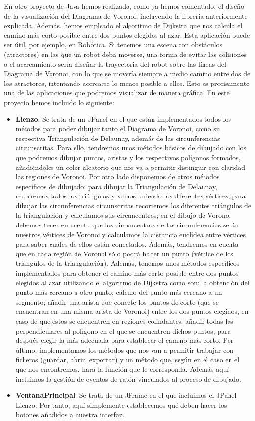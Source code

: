 En otro proyecto de Java hemos realizado, como ya hemos comentado, el diseño de la visualización del Diagrama de Voronoi, incluyendo la librería anteriormente explicada. Además, hemos empleado el algoritmo de Dijkstra que nos calcula el camino más corto posible entre dos puntos elegidos al azar. Esta aplicación puede ser útil, por ejemplo, en Robótica. Si tenemos una escena con obstáculos (atractores) en las que un robot deba moverse, una forma de evitar las colisiones o el acercamiento sería diseñar la trayectoria del robot sobre las líneas del Diagrama de Voronoi, con lo que se movería siempre a medio camino entre dos de los atractores, intentando acercarse lo menos posible a ellos. Esto es precisamente una de las aplicaciones que podremos visualizar de manera gráfica. En este proyecto hemos incluido lo siguiente:

\begin{itemize}
    \item \textbf{Lienzo}: Se trata de un JPanel en el que están implementados todos los métodos para poder dibujar tanto el Diagrama de Voronoi, como su respectiva Triangulación de Delaunay, además de las circunferencias circunscritas. Para ello, tendremos unos métodos básicos de dibujado con los que podremos dibujar puntos, aristas y los respectivos polígonos formados, añadiéndoles un color aleatorio que nos va a permitir distinguir con claridad las regiones de Voronoi. Por otro lado disponemos de otros métodos específicos de dibujado: para dibujar la Triangulación de Delaunay, recorremos todos los triángulos y vamos uniendo los diferentes vértices; para dibujar las circunferencias circunscritas recorremos los diferentes triángulos de la triangulación y calculamos sus circuncentros; en el dibujo de Voronoi debemos tener en cuenta que los circuncentros de las circunferencias serán nuestros vértices de Voronoi y calculamos la distancia euclídea entre vértices para saber cuáles de ellos están conectados. Además, tendremos en cuenta que en cada región de Voronoi sólo podrá haber un punto (vértice de los triángulos de la triangulación).
    Además, tenemos unos métodos específicos implementados para obtener el camino más corto posible entre dos puntos elegidos al azar utilizando el algoritmo de Dijkstra como son: la obtención del punto más cercano a otro punto; cálculo del punto más cercano a un segmento; añadir una arista que conecte los puntos de corte (que se encuentran en una misma arista de Voronoi) entre los dos puntos elegidos, en caso de que éstos se encuentren en regiones colindantes; añadir todas las perpendiculares al polígono en el que se encuentren dichos puntos, para después elegir la más adecuada para establecer el camino más corto.
    Por último, implementamos los métodos que nos van a permitir trabajar con ficheros (guardar, abrir, exportar) y un método que, según en el caso en el que nos encontremos, hará la función que le corresponda. Además aquí incluimos la gestión de eventos de ratón vinculados al proceso de dibujado.
    \item \textbf{VentanaPrincipal}: Se trata de un JFrame en el que incluimos el JPanel Lienzo. Por tanto, aquí simplemente establecemos qué deben hacer los botones añadidos a nuestra interfaz.
\end{itemize}

